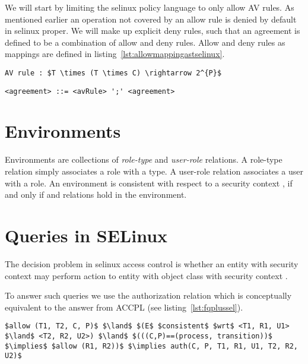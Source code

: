 We will start by limiting the \ac{selinux} policy language to only allow AV rules. As mentioned earlier an operation not covered by an allow rule is denied by default in \ac{selinux} proper. We will make up explicit deny rules, such that an agreement is defined to be a combination of allow and deny rules. Allow and deny rules as mappings are defined in listing~\ref{lst:allowmappingastselinux}.

\lstset{language=AST}
\begin{lstlisting}[frame=single, caption={'allow'/'deny' Rule as a Mapping},label={lst:allowmappingastselinux}]
AV rule : $T \times (T \times C) \rightarrow 2^{P}$
\end{lstlisting}

\lstset{language=AST}
\begin{lstlisting}[frame=single, caption={\ac{selinux} Agreement},label={lst:agreementastselinux}]
<agreement> ::= <avRule> ';' <agreement> 
\end{lstlisting}


\section{Environments}

Environments are collections of \emph{role-type} and \emph{user-role} relations. A role-type relation  simply associates a role with a type. A user-role relation  associates a user with a role. An environment is consistent with respect to a security context , if and only if  and  relations hold in the environment. 

\section{Queries in SELinux}

The decision problem in \ac{selinux} access control is whether an entity with security context  may perform action  to entity with object class  with security context .

To answer such queries we use the authorization relation  which is conceptually equivalent to the  answer from \ac{ACCPL} (see listing~\ref{lst:fqplussel}).

\lstset{mathescape, language=AST} 
\begin{lstlisting}[frame=single, caption={\syn{Permitted} for \ac{selinux}},label={lst:fqplussel}]
$allow (T1, T2, C, P)$ $\land$ $(E$ $consistent$ $wrt$ <T1, R1, U1> $\land$ <T2, R2, U2>) $\land$ $(((C,P)==(process, transition))$ $\implies$ $allow (R1, R2))$ $\implies auth(C, P, T1, R1, U1, T2, R2, U2)$ 
\end{lstlisting}


